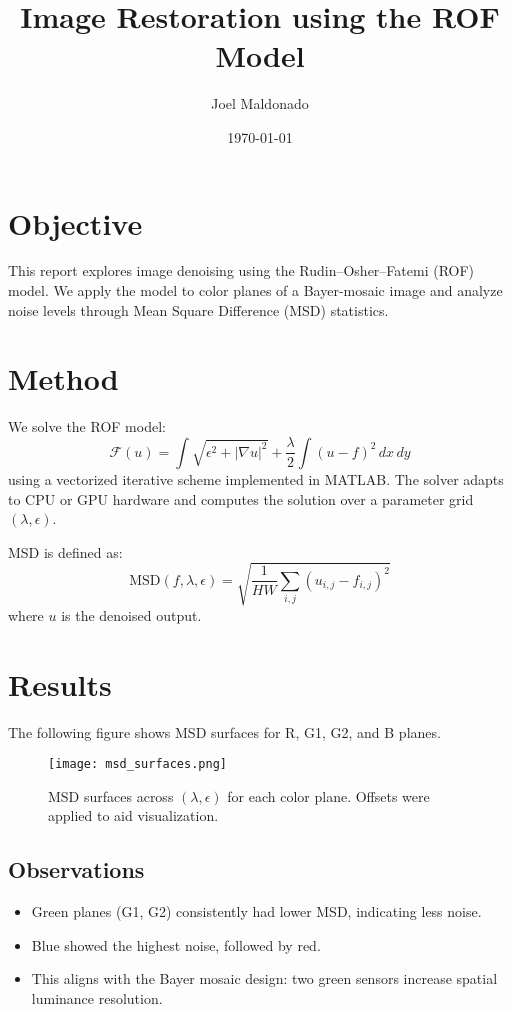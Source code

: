 \documentclass[11pt]{article}
\title{Image Restoration using the ROF Model}
\author{Joel Maldonado}
\date{\today}
\begin{document}
\maketitle

\section*{Objective}
This report explores image denoising using the Rudin–Osher–Fatemi (ROF) model. We apply the model to color planes of a Bayer-mosaic image and analyze noise levels through Mean Square Difference (MSD) statistics.

\section*{Method}
We solve the ROF model:
\[
\mathcal{F}(u) = \int \sqrt{\epsilon^2 + |\nabla u|^2} + \frac{\lambda}{2} \int (u - f)^2 \, dx\,dy
\]
using a vectorized iterative scheme implemented in MATLAB. The solver adapts to CPU or GPU hardware and computes the solution over a parameter grid $(\lambda, \epsilon)$.

MSD is defined as:
\[
\text{MSD}(f, \lambda, \epsilon) = \sqrt{\frac{1}{HW} \sum_{i,j} (u_{i,j} - f_{i,j})^2}
\]
where \( u \) is the denoised output.

\section*{Results}
The following figure shows MSD surfaces for R, G1, G2, and B planes.

\begin{figure}[h!]
    \centering
    \texttt{[image: msd\_surfaces.png]}
    \caption{MSD surfaces across $(\lambda, \epsilon)$ for each color plane. Offsets were applied to aid visualization.}
\end{figure}

\subsection*{Observations}
\begin{itemize}
  \item Green planes (G1, G2) consistently had lower MSD, indicating less noise.
  \item Blue showed the highest noise, followed by red.
  \item This aligns with the Bayer mosaic design: two green sensors increase spatial luminance resolution.
\end{itemize}
\end{document}
